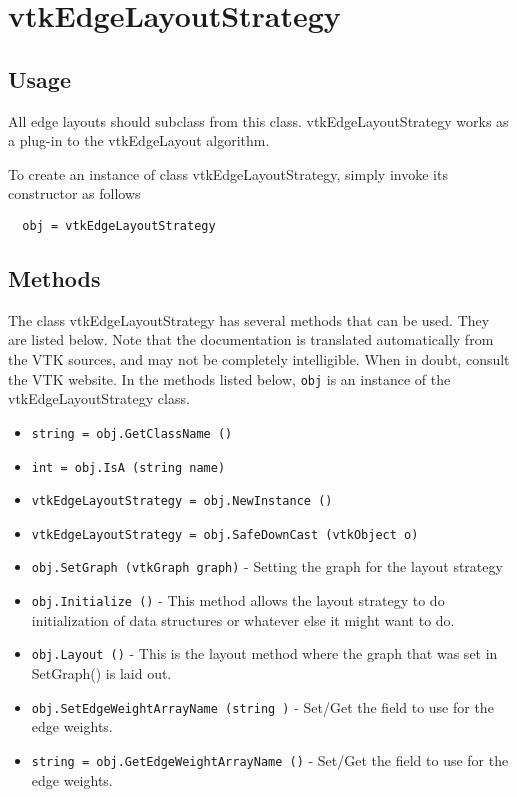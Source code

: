 \section{vtkEdgeLayoutStrategy}

\subsection{Usage}

 All edge layouts should subclass from this class.  vtkEdgeLayoutStrategy
 works as a plug-in to the vtkEdgeLayout algorithm.

To create an instance of class vtkEdgeLayoutStrategy, simply
invoke its constructor as follows
\begin{verbatim}
  obj = vtkEdgeLayoutStrategy
\end{verbatim}
\subsection{Methods}

The class vtkEdgeLayoutStrategy has several methods that can be used.
  They are listed below.
Note that the documentation is translated automatically from the VTK sources,
and may not be completely intelligible.  When in doubt, consult the VTK website.
In the methods listed below, \verb|obj| is an instance of the vtkEdgeLayoutStrategy class.
\begin{itemize}
\item  \verb|string = obj.GetClassName ()|

\item  \verb|int = obj.IsA (string name)|

\item  \verb|vtkEdgeLayoutStrategy = obj.NewInstance ()|

\item  \verb|vtkEdgeLayoutStrategy = obj.SafeDownCast (vtkObject o)|

\item  \verb|obj.SetGraph (vtkGraph graph)| -  Setting the graph for the layout strategy

\item  \verb|obj.Initialize ()| -  This method allows the layout strategy to
 do initialization of data structures
 or whatever else it might want to do. 

\item  \verb|obj.Layout ()| -  This is the layout method where the graph that was
 set in SetGraph() is laid out.

\item  \verb|obj.SetEdgeWeightArrayName (string )| -  Set/Get the field to use for the edge weights.

\item  \verb|string = obj.GetEdgeWeightArrayName ()| -  Set/Get the field to use for the edge weights.

\end{itemize}
